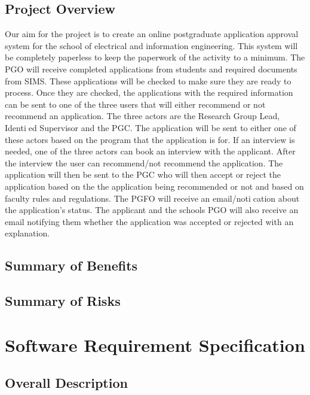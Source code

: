 \documentclass{article}
\begin{document}
\subsection{Project Overview}
Our aim for the project is to create an online postgraduate application approval system for the school of electrical and information engineering. This system will be completely paperless to keep the paperwork of the activity to a minimum.
The PGO will receive completed applications from students and required documents from SIMS.
These applications will be checked to make sure they are ready to process. Once they are checked,
the applications with the required information can be sent to one of the three users that will either
recommend or not recommend an application. The three actors are the Research Group Lead, Identied
Supervisor and the PGC. The application will be sent to either one of these actors based on the program
that the application is for. If an interview is needed, one of the three actors can book an interview
with the applicant. After the interview the user can recommend/not recommend the application. The
application will then be sent to the PGC who will then accept or reject the application based on the
the application being recommended or not and based on faculty rules and regulations. The PGFO
will receive an email/notication about the application's status. The applicant and the schools PGO
will also receive an email notifying them whether the application was accepted or rejected with an
explanation.
\subsection{Summary of Benefits}
\subsection{Summary of Risks}

\section{Software Requirement Specification}
\subsection{Overall Description}
\end{document}
